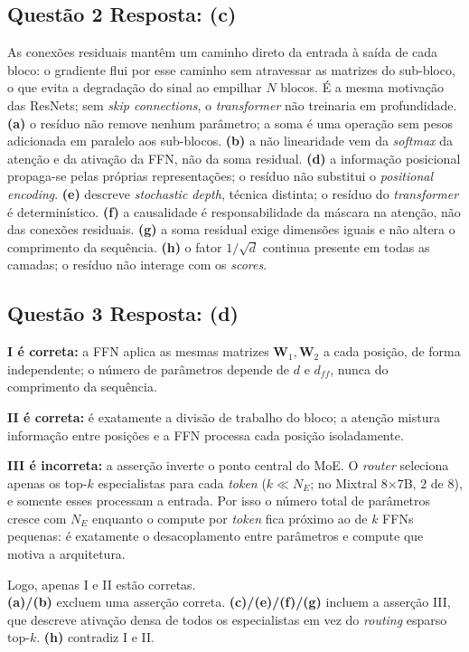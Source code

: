 \documentclass[11pt,a4paper]{article}
\begin{document}
\subsection*{Questão 2 \textemdash{} Resposta: (c)}
As conexões residuais mantêm um caminho direto da entrada à saída de cada bloco: o gradiente flui por esse caminho sem atravessar as matrizes do sub-bloco, o que evita a degradação do sinal ao empilhar $N$ blocos. É a mesma motivação das ResNets; sem \textit{skip connections}, o \textit{transformer} não treinaria em profundidade.\\
\textbf{(a)} o resíduo não remove nenhum parâmetro; a soma é uma operação sem pesos adicionada em paralelo aos sub-blocos.
\textbf{(b)} a não linearidade vem da \textit{softmax} da atenção e da ativação da FFN, não da soma residual.
\textbf{(d)} a informação posicional propaga-se pelas próprias representações; o resíduo não substitui o \textit{positional encoding}.
\textbf{(e)} descreve \textit{stochastic depth}, técnica distinta; o resíduo do \textit{transformer} é determinístico.
\textbf{(f)} a causalidade é responsabilidade da máscara na atenção, não das conexões residuais.
\textbf{(g)} a soma residual exige dimensões iguais e não altera o comprimento da sequência.
\textbf{(h)} o fator $1/\sqrt{d}$ continua presente em todas as camadas; o resíduo não interage com os \textit{scores}.

\subsection*{Questão 3 \textemdash{} Resposta: (d)}
\textbf{I é correta:} a FFN aplica as mesmas matrizes $\mathbf{W}_1, \mathbf{W}_2$ a cada posição, de forma independente; o número de parâmetros depende de $d$ e $d_{ff}$, nunca do comprimento da sequência.

\textbf{II é correta:} é exatamente a divisão de trabalho do bloco; a atenção mistura informação entre posições e a FFN processa cada posição isoladamente.

\textbf{III é incorreta:} a asserção inverte o ponto central do MoE. O \textit{router} seleciona apenas os top-$k$ especialistas para cada \textit{token} ($k \ll N_E$; no Mixtral 8$\times$7B, $2$ de $8$), e somente esses processam a entrada. Por isso o número total de parâmetros cresce com $N_E$ enquanto o compute por \textit{token} fica próximo ao de $k$ FFNs pequenas: é exatamente o desacoplamento entre parâmetros e compute que motiva a arquitetura.

Logo, apenas I e II estão corretas.\\
\textbf{(a)/(b)} excluem uma asserção correta.
\textbf{(c)/(e)/(f)/(g)} incluem a asserção III, que descreve ativação densa de todos os especialistas em vez do \textit{routing} esparso top-$k$.
\textbf{(h)} contradiz I e II.
\end{document}
